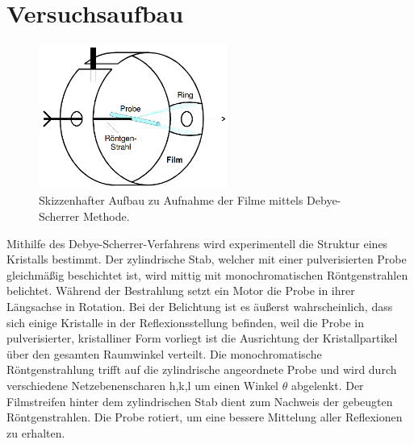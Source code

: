 \section{Versuchsaufbau}
\label{sec:Versuchaufbau}
\begin{figure}
    \centering
    \includegraphics[width=0.55\textwidth]{ressources/aufbau.png}
    \caption{Skizzenhafter Aufbau zu Aufnahme der Filme mittels Debye-Scherrer Methode\cite{skript}.}
    \label{aufbau}
\end{figure}
Mithilfe des Debye-Scherrer-Verfahrens wird experimentell die Struktur eines
Kristalls bestimmt. Der zylindrische Stab, welcher mit einer pulverisierten
Probe gleichmäßig beschichtet ist, wird mittig mit monochromatischen
Röntgenstrahlen belichtet. Während der Bestrahlung setzt ein Motor die Probe in
ihrer Längsachse in Rotation. Bei der Belichtung ist es äußerst wahrscheinlich,
dass sich einige Kristalle in der Reflexionsstellung befinden, weil die Probe in
 pulverisierter, kristalliner Form vorliegt ist die Ausrichtung der Kristallpartikel
 über den gesamten Raumwinkel verteilt. Die monochromatische Röntgenstrahlung trifft
 auf die zylindrische angeordnete Probe und wird durch verschiedene
 Netzebenenscharen {h,k,l} um einen Winkel $\theta$ abgelenkt. Der Filmstreifen hinter dem
 zylindrischen Stab dient zum Nachweis der gebeugten Röntgenstrahlen. Die Probe
 rotiert, um eine bessere Mittelung aller Reflexionen zu erhalten.
